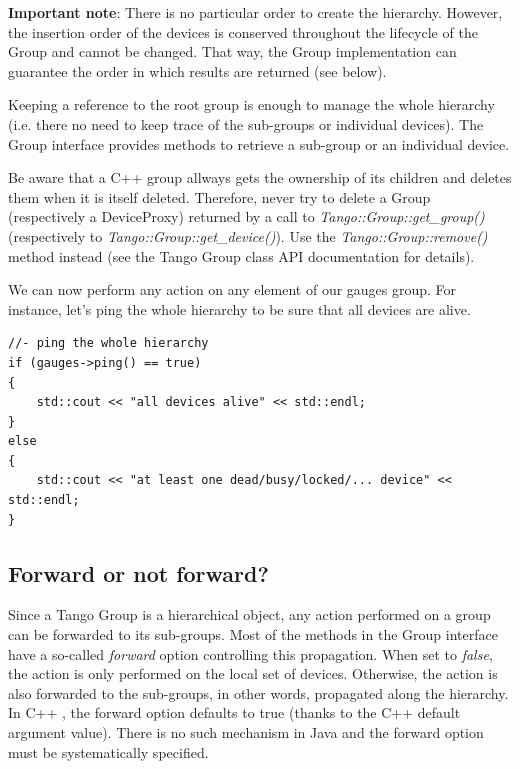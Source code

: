 \textbf{Important note}: There is no particular order to create the
hierarchy. However, the insertion order of the devices is conserved
throughout the lifecycle of the Group and cannot be changed. That
way, the Group implementation can guarantee the order in which results
are returned (see below). 

Keeping a reference to the root group is enough to manage
the whole hierarchy (i.e. there no need to keep trace of the sub-groups
or individual devices). The Group interface provides methods to retrieve
a sub-group or an individual device. 

Be aware that a C++ group allways gets the ownership of its children
and deletes them when it is itself deleted. Therefore, never try to
delete a Group (respectively a DeviceProxy) returned by a call to
\emph{Tango::Group::get\_group()} (respectively
to \emph{Tango::Group::get\_device()}). Use the
\emph{Tango::Group::remove()} method instead (see the
Tango Group class API documentation for details). 

We can now perform any action on any element of our \textquotedbl{}gauges\textquotedbl{}
group. For instance, let's ping the whole hierarchy to be sure that
all devices are alive.


\begin{verbatim}
//- ping the whole hierarchy 
if (gauges->ping() == true)
{
    std::cout << "all devices alive" << std::endl;
}
else
{
    std::cout << "at least one dead/busy/locked/... device" << std::endl;
}
\end{verbatim}
 


\subsection{Forward or not forward?}

Since a Tango Group is a hierarchical object, any action performed
on a group can be forwarded to its sub-groups. Most of the methods
in the Group interface have a so-called \emph{forward} option controlling
this propagation. When set to \emph{false}, the action is only performed
on the local set of devices. Otherwise, the action is also forwarded
to the sub-groups, in other words, propagated along the hierarchy.
In C++ , the forward option defaults to true (thanks to the C++ default
argument value). There is no such mechanism in Java and the forward
option must be systematically specified.


